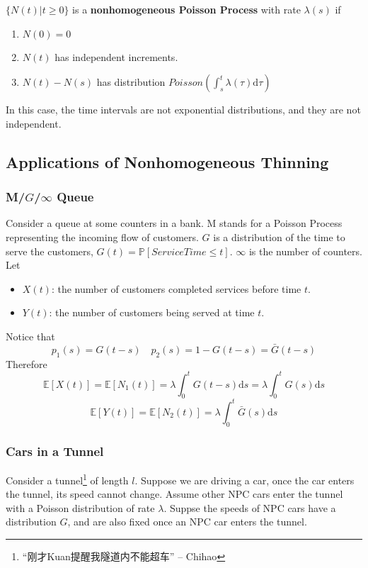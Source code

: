         \begin{definition}\label{Def:NonhomogeneousPoissonProcess}
            $\{ N(t) | t \ge 0 \}$ is a \textbf{nonhomogeneous Poisson Process} with rate $\lambda(s)$ if
            \begin{enumerate}
                \item $N(0)=0$
                \item $N(t)$ has independent increments.
                \item $N(t)-N(s)$ has distribution $Poisson\left(\int_s^t \lambda(\tau)\mathrm{d}\tau\right)$
            \end{enumerate}
        \end{definition}
        \begin{remark}
            In this case, the time intervals are not exponential distributions, and they are not independent.
        \end{remark}

    \subsection{Applications of Nonhomogeneous Thinning}

        \subsubsection{M/$G$/$\infty$ Queue}
        Consider a queue at some counters in a bank. M stands for a Poisson Process representing the incoming flow of customers. $G$ is a distribution of the time to serve the customers, $G(t) = \mathbb{P}[ServiceTime \le t]$. $\infty$ is the number of counters. Let
        \begin{itemize}
            \item $X(t)$: the number of customers completed services before time $t$.
            \item $Y(t)$: the number of customers being served at time $t$.
        \end{itemize}

        Notice that
        \[ p_1(s) = G(t-s) \quad p_2(s) = 1 - G(t-s) = \bar{G}(t-s) \]
        Therefore
        \[ \mathbb{E}[X(t)] = \mathbb{E}[N_1(t)] = \lambda\int_0^t G(t-s)\mathrm{d}s = \lambda\int_0^t G(s)\mathrm{d}s \]
        \[ \mathbb{E}[Y(t)] = \mathbb{E}[N_2(t)] = \lambda\int_0^t \bar{G}(s)\mathrm{d}s \]

        \subsubsection{Cars in a Tunnel}
        Consider a tunnel\footnote{“刚才Kuan提醒我隧道内不能超车” -- Chihao} of length $l$. Suppose we are driving a car, once the car enters the tunnel, its speed cannot change. Assume other NPC cars enter the tunnel with a Poisson distribution of rate $\lambda$. Suppse the speeds of NPC cars have a distribution $G$, and are also fixed once an NPC car enters the tunnel.

